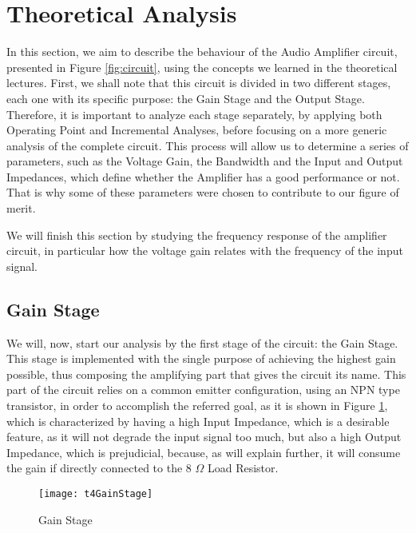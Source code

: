 \section{Theoretical Analysis}
\label{sec:analysis}
In this section, we aim to describe the behaviour of the Audio Amplifier circuit, presented in Figure \ref{fig:circuit}, using the concepts we learned in the theoretical lectures. First, we shall note that this circuit is divided in two different stages, each one with its specific purpose: the Gain Stage and the Output Stage. Therefore, it is important to analyze each stage separately, by applying both Operating Point and Incremental Analyses, before focusing on a more generic analysis of the complete circuit. This process will allow us to determine a series of parameters, such as the Voltage Gain, the Bandwidth and the Input and Output Impedances, which define whether the Amplifier has a good performance or not. That is why some of these parameters were chosen to contribute to our figure of merit.

We will finish this section by studying the frequency response of the amplifier circuit, in particular how the voltage gain relates with the frequency of the input signal.

\subsection{Gain Stage}

We will, now, start our analysis by the first stage of the circuit: the Gain Stage. This stage is implemented with the single purpose of achieving the highest gain possible, thus composing the amplifying part that gives the circuit its name. This part of the circuit relies on a common emitter configuration, using an NPN type transistor, in order to accomplish the referred goal, as it is shown in Figure \ref{fig:GainStage}, which is characterized by having a high Input Impedance, which is a desirable feature, as it will not degrade the input signal too much, but also a high Output Impedance, which is prejudicial, because, as will explain further, it will consume the gain if directly connected to the 8 $\Omega$ Load Resistor.

\FloatBarrier
\begin{figure}[h] 
	\centering
	\texttt{[image: t4GainStage]}
	\caption{Gain Stage}
	\label{fig:GainStage}
\end{figure}
\FloatBarrier

